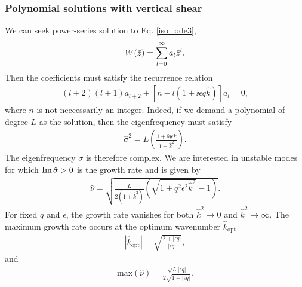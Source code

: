\subsubsection{Polynomial solutions with vertical shear}
We can seek power-series solution to Eq. \ref{iso_ode3},
\begin{align}
  W(\hat{z}) = \sum_{l=0}^\infty a_l\hat{z}^l. 
\end{align}
Then the coefficients must satisfy the recurrence relation
\begin{align}
  (l+2)(l+1)a_{l+2} +
  \left[n - l\left(1+\ii \epsilon q  \hat{k}\right)\right] a_l = 0, 
\end{align}
where $n$ is not neccessarily an integer. Indeed, if we demand
a polynomial of degree $L$ as the solution, then the eigenfrequency
must satisfy
\begin{align}
\hat{\sigma}^2 = L\left(\frac{1+\ii q \epsilon
    \hat{k}}{1+\hat{k}^2}\right).
\end{align}
The eigenfrequency $\sigma$ is therefore complex. We are interested in
unstable modes for which $\operatorname{Im}{\hat{\sigma}}>0$ is the growth rate and is
given by 
\begin{align}\label{simple_growth}
  \hat{\nu} =\sqrt{
   \frac{L}{2\left(1+\hat{k}^2\right)}\left(\sqrt{1+q^2\epsilon^2\hat{k}^2} - 
    1\right)}. 
\end{align}
For fixed $q$ and $\epsilon$, the growth rate vanishes for both
$\hat{k}^2\to0$ and $\hat{k}^2\to\infty$. The maximum growth rate
occurs at the optimum wavenumber $\hat{k}_\mathrm{opt}$
\begin{align}
  |\hat{k}_\mathrm{opt}| = \sqrt{\frac{2+|\epsilon q|}{|\epsilon q|}},
\end{align}
and
\begin{align}
\mathrm{max}\left(\hat{\nu}\right) =\frac{\sqrt{L}|\epsilon
  q|}{2\sqrt{1+|\epsilon q|}}. \label{iso_max_growth}
\end{align}




